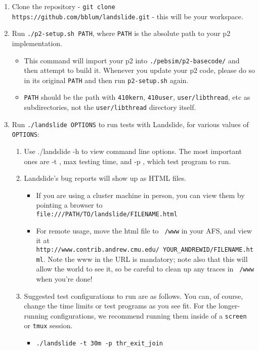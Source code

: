 \documentclass{article}
\begin{document}
\begin{enumerate}
	\item Clone the repository - {\tt git clone https://github.com/bblum/landslide.git} - this will be your workspace.
	\item Run {\tt ./p2-setup.sh PATH}, where {\tt PATH} is the absolute path to your p2 implementation.
		\begin{itemize}
			\item This command will import your p2 into {\tt ./pebsim/p2-basecode/} and then attempt to build it.
				Whenever you update your p2 code, please do so in its original {\tt PATH}
				and then run {\tt p2-setup.sh} again.
			\item {\tt PATH} should be the path with {\tt 410kern}, {\tt 410user}, {\tt user/libthread}, etc as subdirectories, not the {\tt user/libthread} directory itself.
		\end{itemize}
	\item Run {\tt ./landslide OPTIONS} to run tests with Landslide, for various values of {\tt OPTIONS}:
		\begin{enumerate}
			\item Use ./landslide -h to view command line options. The most important ones are -t , max testing
time, and -p , which test program to run.
			\item Landslide's bug reports will show up as HTML files.
				\begin{itemize}
					\item If you are using a cluster machine in person, you can view them by pointing a browser to \\
						{\tt file:///PATH/TO/landslide/FILENAME.html}
					\item For remote usage, move the html file to {\tt ~/www} in your AFS, and view it at \\
						{\tt http://www.contrib.andrew.cmu.edu/~YOUR\_ANDREWID/FILENAME.html}.
						Note the www in the URL is mandatory;
						note also that this will allow the world to see it,
						so be careful to clean up any traces in {\tt ~/www} when you're done!
				\end{itemize}
			\item Suggested test configurations to run are as follows.
				You can, of course, change the time limits or test programs as you see fit.
				For the longer-running configurations,
				we recommend running them inside of a {\tt screen} or {\tt tmux} session.
				\begin{itemize}
					\item \texttt{./landslide -t 30m -p thr\_exit\_join}

\end{itemize}
\end{enumerate}
\end{enumerate}
\end{document}
